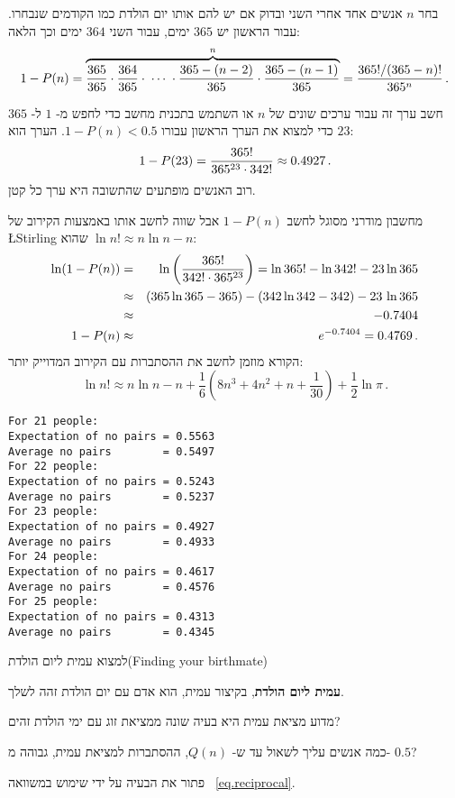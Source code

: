 \solution{}

בחר 
$n$
אנשים אחד אחרי השני ובדוק אם יש להם אותו יום הולדת כמו הקודמים שנבחרו. עבור הראשון יש 
$365$
ימים, עבור השני
$364$
ימים וכך הלאה:
\[
1-P(n)=
  \overbrace{\displaystyle\frac{365}{365}\cdot\frac{364}{365}
  \cdot \;\cdots \; \cdot \frac{365-(n-2)}{365}
  \cdot\frac{365-(n-1)}{365}}^{n}
=\displaystyle\frac{365!/(365-n)!}{365^{n}}\,.
\]

חשב ערך זה עבור ערכים שונים של
$n$
או השתמש בתכנית מחשב כדי לחפש מ-%
$1$
ל-%
$365$
כדי למצוא את הערך הראשון עבורו
$1-P(n)<0.5$.
הערך הוא
$23$:
\[
1-P(23)=\displaystyle\frac{365!}{365^{23}\cdot 342!}\approx 0.4927\,.
\]
רוב האנשים מופתעים שהתשובה היא ערך כל קטן.

מחשבון מודרני מסוגל לחשב 
$1-P(n)$
אבל שווה לחשב אותו באמצעות הקירוב של 
\L{Stirling}
שהוא
$\ln n! \approx n\ln n - n$:
\begin{eqnarray*}
\ln (1-P(n))&=&
  \ln\left(\displaystyle\frac{365!}{342!\cdot 365^{23}}\right)=\ln 365! - \ln 342! -23 \ln 365\\
&\approx& (365\ln 365 -365) - (342\ln 342 -342) - 23\,\ln 365 \\
&\approx&-0.7404\\
1-P(n)&\approx&e^{-0.7404}=0.4769\,.
\end{eqnarray*}
הקורא מוזמן לחשב את ההסתברות עם הקירוב המדוייק יותר:
\[
\ln n!  \approx n\ln n - n + \frac{1}{6}\left(8n^3+4n^2+n+\frac{1}{30}\right)+\frac{1}{2}\ln\pi\,.
\]
\newpage

\sml{}

\begin{verbatim}
For 21 people:
Expectation of no pairs = 0.5563
Average no pairs        = 0.5497
For 22 people:
Expectation of no pairs = 0.5243
Average no pairs        = 0.5237
For 23 people:
Expectation of no pairs = 0.4927
Average no pairs        = 0.4933
For 24 people:
Expectation of no pairs = 0.4617
Average no pairs        = 0.4576
For 25 people:
Expectation of no pairs = 0.4313
Average no pairs        = 0.4345
\end{verbatim}


\begin{prob}{למצוא עמית ליום הולדת}{}{(Finding your birthmate)}

\textbf{עמית ליום הולדת},
בקיצור עמית, הוא אדם עם יום הולדת זהה לשלך.

מדוע מציאת עמית היא בעיה שונה ממציאת זוג עם ימי הולדת זהים?

כמה אנשים עליך לשאול עד ש-%
$Q(n)$,
ההסתברות למציאת עמית, גבוהה מ-%
$0.5$?

פתור את הבעיה על ידי שימוש במשוואה%
~\ref{eq.reciprocal}.
\end{prob}

